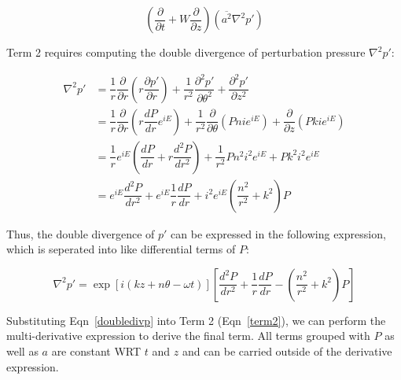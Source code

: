 \documentclass[]{aiaa-tc}%
\begin{document}
\begin{equation}\label{term2}
\left( \dfrac{\partial}{\partial t} + W \dfrac{\partial}{\partial z} \right) (\overline{a^2}\nabla^2p')
\end{equation}

Term 2 requires computing the double divergence of perturbation pressure $\nabla^2 p'$:

\begin{align*}
\nabla^2p'
  &= \dfrac{1}{r}\dfrac{\partial}{\partial r} \left( r\dfrac{\partial p'}{\partial r} \right)
      + \dfrac{1}{r^2} \dfrac{\partial^2 p'}{\partial \theta^2}
      + \dfrac{\partial^2 p'}{\partial z^2} \\
&= \dfrac{1}{r}\dfrac{\partial}{\partial r} \left( r \dfrac{dP}{dr} e^{iE} \right)
      + \dfrac{1}{r^2} \dfrac{\partial }{\partial \theta} \left( Pn ie^{iE} \right)
      + \dfrac{\partial}{\partial z} \left( Pk ie^{iE} \right) \\
&= \dfrac{1}{r} e^{iE} \left(
    \dfrac{dP}{dr} + r \dfrac{d^2P}{dr^2} \right)
      + \dfrac{1}{r^2} Pn^2 i^2 e^{iE}
      + Pk^2 i^2  e^{iE} \\
&= e^{iE} \dfrac{d^2P}{dr^2}
    + e^{iE} \dfrac{1}{r} \dfrac{dP}{dr}
    + i^2 e^{iE} \left( \dfrac{n^2}{r^2} + k^2 \right) P
\end{align*}

Thus, the double divergence of $p'$ can be expressed in the following expression, which is seperated into like differential terms of $P$:

\begin{equation} \label{doubledivp}
\boxed{ \nabla^2p'= \exp[i(kz + n\theta -\omega t)] \left[
      \dfrac{d^2P}{dr^2}
    + \dfrac{1}{r} \dfrac{dP}{dr}
    - \left( \dfrac{n^2}{r^2} + k^2 \right) P \right] }
\end{equation}

Substituting Eqn~\ref{doubledivp} into Term 2 (Eqn~\ref{term2}), we can perform the multi-derivative expression to derive the final term.  All terms grouped with $P$ as well as $a$ are constant WRT $t$ and $z$ and can be carried outside of the derivative expression.
\end{document}
